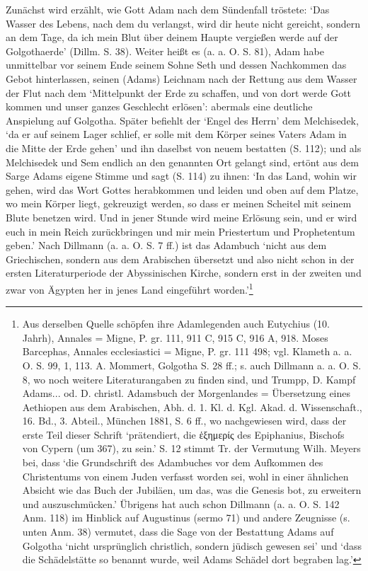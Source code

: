 \documentclass[a4paper, 11pt, oneside]{article}
\begin{document}
Zunächst wird erzählt, wie Gott Adam nach dem Sündenfall tröstete: `Das Wasser des Lebens, nach dem du verlangst, wird dir heute nicht gereicht, sondern an dem Tage, da ich mein Blut über deinem Haupte vergießen werde auf der Golgothaerde' (Dillm. S. 38). Weiter heißt es (a. a. O. S. 81), Adam habe unmittelbar vor seinem Ende seinem Sohne Seth und dessen Nachkommen das Gebot hinterlassen, seinen (Adams) Leichnam nach der Rettung aus dem Wasser der Flut nach dem `Mittelpunkt der Erde zu schaffen, und von dort werde Gott kommen und unser ganzes Geschlecht erlösen': abermals eine deutliche Anspielung auf Golgotha. Später befiehlt der `Engel des Herrn' dem Melchisedek, `da er auf seinem Lager schlief, er solle mit dem Körper seines Vaters Adam in die Mitte der Erde gehen' und ihn daselbst von neuem bestatten (S. 112); und als Melchisedek und Sem endlich an den genannten Ort gelangt sind, ertönt aus dem Sarge Adams eigene Stimme und sagt (S. 114) zu ihnen: `In das Land, wohin wir gehen, wird das Wort Gottes herabkommen und leiden und oben auf dem Platze, wo mein Körper liegt, gekreuzigt werden, so dass er meinen Scheitel mit seinem Blute benetzen wird. Und in jener Stunde wird meine Erlösung sein, und er wird euch in mein Reich zurückbringen und mir mein Priestertum und Prophetentum geben.' Nach Dillmann (a. a. O. S. 7 ff.) ist das Adambuch `nicht aus dem Griechischen, sondern aus dem Arabischen übersetzt und also nicht schon in der ersten Literaturperiode der Abyssinischen Kirche, sondern erst in der zweiten und zwar von Ägypten her in jenes Land eingeführt worden.'\footnote{Aus derselben Quelle schöpfen ihre Adamlegenden auch Eutychius (10. Jahrh), Annales = Migne, P. gr. 111, 911 C, 915 C, 916 A, 918. Moses Barcephas, Annales ecclesiastici = Migne, P. gr. 111 498; vgl. Klameth a. a. O. S. 99, 1, 113. A. Mommert, Golgotha S. 28 ff.; s. auch Dillmann a. a. O. S. 8, wo noch weitere Literaturangaben zu finden sind, und Trumpp, D. Kampf Adams... od. D. christl. Adamsbuch der Morgenlandes = Übersetzung eines Aethiopen aus dem Arabischen, Abh. d. 1. Kl. d. Kgl. Akad. d. Wissenschaft., 16. Bd., 3. Abteil., München 1881, S. 6 ff., wo nachgewiesen wird, dass der erste Teil dieser Schrift `prätendiert, die ἑξημερίς des Epiphanius, Bischofs von Cypern (um 367), zu sein.' S. 12 stimmt Tr. der Vermutung Wilh. Meyers bei, dass `die Grundschrift des Adambuches vor dem Aufkommen des Christentums von einem Juden verfasst worden sei, wohl in einer ähnlichen Absicht wie das Buch der Jubiläen, um das, was die Genesis bot, zu erweitern und auszuschmücken.' Übrigens hat auch schon Dillmann (a. a. O. S. 142 Anm. 118) im Hinblick auf Augustinus (sermo 71) und andere Zeugnisse (s. unten Anm. 38) vermutet, dass die Sage von der Bestattung Adams auf Golgotha `nicht ursprünglich christlich, sondern jüdisch gewesen sei' und `dass die Schädelstätte so benannt wurde, weil Adams Schädel dort begraben lag.'}
\end{document}
